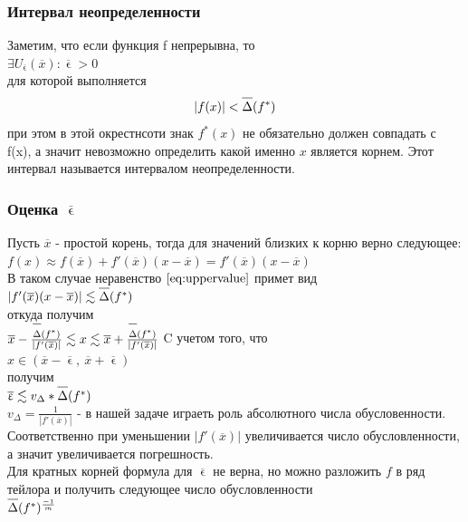 \documentclass[16pt]{article}
\begin{document}
			\subsubsection{Интервал неопределенности}
			Заметим, что если функция f непрерывна, то\\
			$\exists U_{\overline{\upvarepsilon}}(\overline{x}): \overline{\upvarepsilon}>0$\\
			для которой выполняется\\
			\begin{equation}\label{eq:uppervalue}
			|f(x)|<\overline{\raisebox{3mm}{}\Delta}(f^{*})
			\end{equation}
			при этом в этой окрестнсоти знак $f^{*}(x)$ не обязательно должен совпадать с f(x), а значит невозможно определить какой именно $x$ является корнем. Этот интервал называется интервалом неопределенности. 
			\subsubsection{Оценка $\overline{\upvarepsilon}$}
			Пусть $\overline{x}$ - простой корень, тогда для значений близких к корню верно следующее:\\
			$f(x)\approx f(\overline{x})+f'(\overline{x})(x-\overline{x})=f'(\overline{x})(x-\overline{x})$\\
			В таком случае неравенство $\eqref{eq:uppervalue}$ примет вид\\
			$|f'(\overline{x})(x-\overline{x})| \lesssim \overline{\raisebox{3mm}{}\Delta}(f^{*})$\\
			откуда получим\\
			$\overline{x} - \frac{\overline{\raisebox{3mm}{}\Delta}(f^{*})}{|f'(\overline{x})|}
			\lesssim x \lesssim 
			\overline{x} + \frac{\overline{\raisebox{3mm}{}\Delta}(f^{*})}{|f'(\overline{x})|}
			$
			C учетом того, что\\ 
			$x\in (\overline{x} - \overline{\upvarepsilon},\ \overline{x} + \overline{\upvarepsilon})$\\
			получим\\
			$\overline{\upvarepsilon} \lesssim v_{\Delta}*\overline{\raisebox{3mm}{}\Delta}(f^{*})$\\
			$v_{\Delta} = \frac{1}{|f'(\overline{x})|}$ - в нашей задаче играеть роль абсолютного числа обусловенности. Соответственно при уменьшении $|f'(\overline{x})|$ увеличивается число обусловленности, а значит увеличивается погрешность.\\
			Для кратных корней формула для $\overline{\upvarepsilon}$ не верна, но можно разложить $f$ в ряд тейлора и получить следующее число обусловленности\\ $\overline{\raisebox{3mm}{}\Delta}(f^{*})^{\frac{-1}{m}}$
\end{document}
